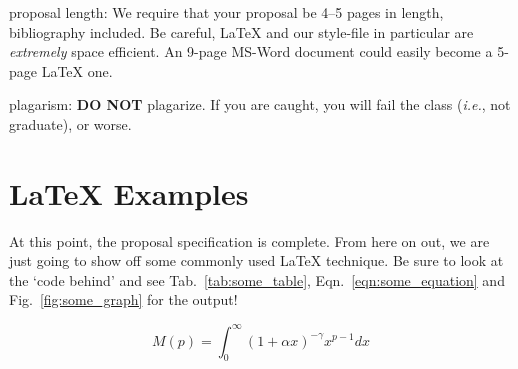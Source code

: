 \documentclass{sig-alternate}
\begin{document}
\begin{enumerate*}
	\item {\sc proposal length}: We require that your proposal be 4--5 pages in length, bibliography included. Be careful, \LaTeX{} and our style-file in particular are \textit{extremely} space efficient. An 9-page MS-Word document could easily become a 5-page \LaTeX{} one.\vspace{5pt}
	\item {\sc plagarism}: \textbf{DO NOT} plagarize. If you are caught, you will fail the class (\textit{i.e.}, not graduate), or worse. 
\end{enumerate*}

\section{\LaTeX{} Examples}
\label{app:latex_examples}

At this point, the proposal specification is complete. From here on out, we are just going to show off some commonly used \LaTeX{} technique. Be sure to look at the `code behind' and see Tab.~\ref{tab:some_table}, Eqn.~\ref{eqn:some_equation} and Fig.~\ref{fig:some_graph} for the output!

\begin{equation}
M(p) = \int^\infty_0 (1+\alpha x)^{-\gamma}x^{p-1}dx
\label{eqn:some_equation}
\end{equation}

\end{document}
